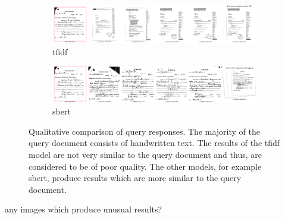 \begin{figure}[h!]
    \ContinuedFloat
    \begin{subfigure}{\textwidth}
        \centering
        \includegraphics[width=1\textwidth]{images/query_results/4542b223317eba23e4bda3e1536d61c8e2d2890a6439830ca8c62650bc1aac70/Most_similar_images_found_by_tfidf.pdf}
        \caption{\ac{tfidf}}
        \label{fig:bas_query_resp_tfidf}
    \end{subfigure}

    \begin{subfigure}{\textwidth}
        \centering
        \includegraphics[width=1\textwidth]{images/query_results/4542b223317eba23e4bda3e1536d61c8e2d2890a6439830ca8c62650bc1aac70/Most_similar_images_found_by_hugging.pdf}
        \caption{\ac{sbert}}
        \label{fig:good_query_resp_sbert}
    \end{subfigure}

\caption[Qualitative comparison of query responses]{Qualitative comparison of query responses.
The majority of the query document consists of handwritten text.
The results of the \ac{tfidf} model are not very similar to the query document and thus, are considered to be of poor quality.
The other models, for example \ac{sbert}, produce results which are more similar to the query document.
}
\label{fig:comp_query_resp}
\end{figure}



any images which produce unusual results?